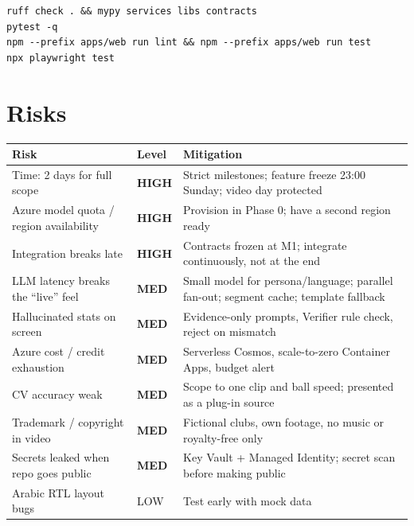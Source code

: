 \documentclass[11pt,a4paper]{article}
\begin{document}
\begin{verbatim}
ruff check . && mypy services libs contracts
pytest -q
npm --prefix apps/web run lint && npm --prefix apps/web run test
npx playwright test
\end{verbatim}

\section{Risks}
\begin{tabularx}{\linewidth}{@{}Y l Y@{}}
\toprule
Risk & Level & Mitigation \\
\midrule
Time: 2 days for full scope              & \textbf{\color{pmred}HIGH} & Strict milestones; feature freeze 23:00 Sunday; video day protected \\
Azure model quota / region availability  & \textbf{\color{pmred}HIGH} & Provision in Phase 0; have a second region ready \\
Integration breaks late                  & \textbf{\color{pmred}HIGH} & Contracts frozen at M1; integrate continuously, not at the end \\
LLM latency breaks the ``live'' feel     & \textbf{\color{pmamber}MED} & Small model for persona/language; parallel fan-out; segment cache; template fallback \\
Hallucinated stats on screen             & \textbf{\color{pmamber}MED} & Evidence-only prompts, Verifier rule check, reject on mismatch \\
Azure cost / credit exhaustion           & \textbf{\color{pmamber}MED} & Serverless Cosmos, scale-to-zero Container Apps, budget alert \\
CV accuracy weak                         & \textbf{\color{pmamber}MED} & Scope to one clip and ball speed; presented as a plug-in source \\
Trademark / copyright in video           & \textbf{\color{pmamber}MED} & Fictional clubs, own footage, no music or royalty-free only \\
Secrets leaked when repo goes public     & \textbf{\color{pmamber}MED} & Key Vault + Managed Identity; secret scan before making public \\
Arabic RTL layout bugs                   & LOW  & Test early with mock data \\
\bottomrule
\end{tabularx}

\end{document}
